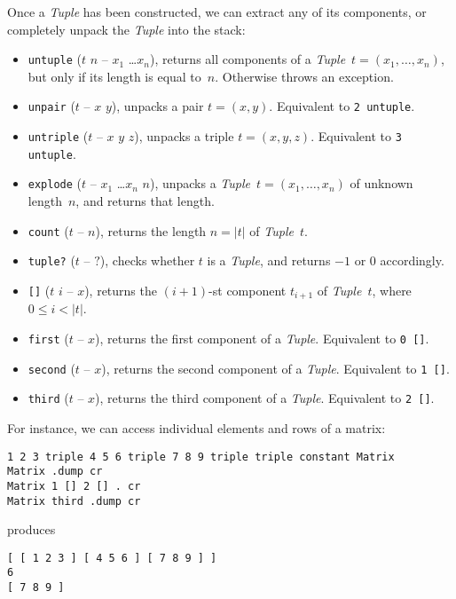 \documentclass[12pt,oneside]{article}
\begin{document}
Once a {\em Tuple\/} has been constructed, we can extract any of its components, or completely unpack the {\em Tuple\/} into the stack:
\begin{itemize}
\item {\tt untuple} ($t$ $n$ -- $x_1$ \dots $x_n$), returns all components of a {\em Tuple\/}~$t=(x_1,\ldots,x_n)$, but only if its length is equal to~$n$. Otherwise throws an exception.
\item {\tt unpair} ($t$ -- $x$ $y$), unpacks a pair $t=(x,y)$. Equivalent to {\tt 2 untuple}.
\item {\tt untriple} ($t$ -- $x$ $y$ $z$), unpacks a triple $t=(x,y,z)$. Equivalent to {\tt 3 untuple}.
\item {\tt explode} ($t$ -- $x_1$ \dots $x_n$ $n$), unpacks a {\em Tuple\/}~$t=(x_1,\ldots,x_n)$ of unknown length~$n$, and returns that length.
\item {\tt count} ($t$ -- $n$), returns the length $n=|t|$ of {\em Tuple\/}~$t$.
\item {\tt tuple?} ($t$ -- $?$), checks whether $t$ is a {\em Tuple}, and returns $-1$ or $0$ accordingly.
\item {\tt []} ($t$ $i$ -- $x$), returns the $(i+1)$-st component $t_{i+1}$ of {\em Tuple\/}~$t$, where $0\leq i<|t|$.
\item {\tt first} ($t$ -- $x$), returns the first component of a {\em Tuple}. Equivalent to {\tt 0 []}.
\item {\tt second} ($t$ -- $x$), returns the second component of a {\em Tuple}. Equivalent to {\tt 1 []}.
\item {\tt third} ($t$ -- $x$), returns the third component of a {\em Tuple}. Equivalent to {\tt 2 []}.
\end{itemize}
For instance, we can access individual elements and rows of a matrix:
\begin{verbatim}
1 2 3 triple 4 5 6 triple 7 8 9 triple triple constant Matrix
Matrix .dump cr
Matrix 1 [] 2 [] . cr
Matrix third .dump cr
\end{verbatim}
produces
\begin{verbatim}
[ [ 1 2 3 ] [ 4 5 6 ] [ 7 8 9 ] ] 
6 
[ 7 8 9 ] 
\end{verbatim}
\end{document}
